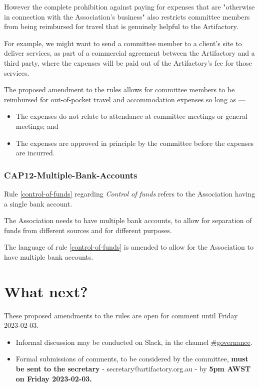 \documentclass[../constitution.tex]{subfiles}
\begin{document}
However the complete prohibition against paying for expenses that are "otherwise in connection with the Association's business" also restricts committee members from being reimbursed for travel that is genuinely helpful to the Artifactory.

For example, we might want to send a committee member to a client's site to deliver services, as part of a commercial agreement between the Artifactory and a third party, where the expenses will be paid out of the Artifactory's fee for those services.

The proposed amendment to the rules allows for committee members to be reimbursed for out-of-pocket travel and accommodation expenses so long as ---

\begin{itemize}
    \item The expenses do not relate to attendance at committee meetings or general meetings; and
    \item The expenses are approved in principle by the committee before the expenses are incurred.
\end{itemize}


\section*{CAP12-Multiple-Bank-Accounts}

Rule \ref{control-of-funds} regarding \textit{Control of funds} refers to the Association having a single bank account.

The Association needs to have multiple bank accounts, to allow for separation of funds from different sources and for different purposes.

The language of rule \ref{control-of-funds} is amended to allow for the Association to have multiple bank accounts.

\part*{What next?}

These proposed amendments to the rules are open for comment until Friday 2023-02-03.

\begin{itemize}
    \item Informal discussion may be conducted on Slack, in the channel \href{https://perthartifactory.slack.com/archives/C04GDNBFGN5}{\#governance}.
    \item Formal submissions of comments, to be considered by the committee, \textbf{must be sent to the secretary} - secretary@artifactory.org.au - by \textbf{5pm AWST on Friday 2023-02-03.}
\end{itemize}
\end{document}
